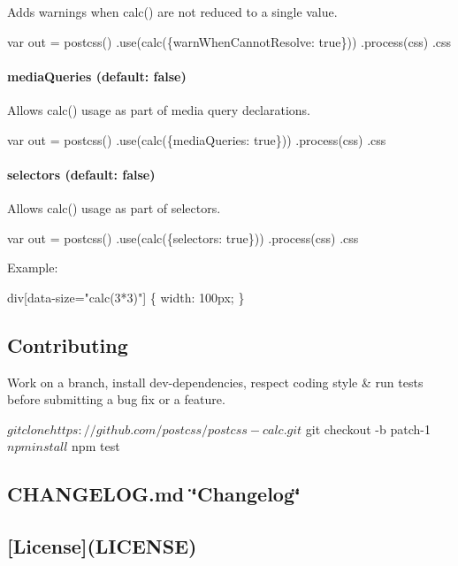 Adds warnings when calc() are not reduced to a single value.


\begin{DoxyCode}
var out = postcss()
  .use(calc(\{warnWhenCannotResolve: true\}))
  .process(css)
  .css
\end{DoxyCode}


\paragraph*{{\ttfamily media\+Queries} (default\+: {\ttfamily false})}

Allows calc() usage as part of media query declarations.


\begin{DoxyCode}
var out = postcss()
  .use(calc(\{mediaQueries: true\}))
  .process(css)
  .css
\end{DoxyCode}


\paragraph*{{\ttfamily selectors} (default\+: {\ttfamily false})}

Allows calc() usage as part of selectors.


\begin{DoxyCode}
var out = postcss()
  .use(calc(\{selectors: true\}))
  .process(css)
  .css
\end{DoxyCode}


Example\+:


\begin{DoxyCode}
div[data-size="calc(3*3)"] \{
  width: 100px;
\}
\end{DoxyCode}
 



\subsection*{Contributing}

Work on a branch, install dev-\/dependencies, respect coding style \& run tests before submitting a bug fix or a feature.


\begin{DoxyCode}
$ git clone https://github.com/postcss/postcss-calc.git
$ git checkout -b patch-1
$ npm install
$ npm test
\end{DoxyCode}


\subsection*{C\+H\+A\+N\+G\+E\+L\+O\+G.\+md \char`\"{}\+Changelog\char`\"{}}

\subsection*{\mbox{[}License\mbox{]}(L\+I\+C\+E\+N\+SE)}